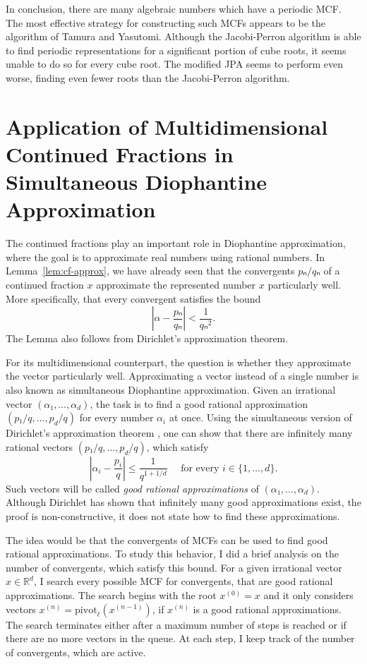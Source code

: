In conclusion, there are many algebraic numbers which have a periodic MCF.
The most effective strategy for constructing such MCFs appears to be the algorithm of
Tamura and Yasutomi.
Although the Jacobi-Perron algorithm is able to find periodic representations
for a significant portion of cube roots, it seems unable to do so for every
cube root.
The modified JPA seems to perform even worse, finding even fewer roots than the
Jacobi-Perron algorithm.

\section{Application of Multidimensional Continued Fractions in Simultaneous Diophantine Approximation}

The continued fractions play an important role in Diophantine approximation,
where the goal is to approximate real numbers using rational numbers.
In Lemma~\vref{lem:cf-approx}, we have already seen that the convergents
$pₙ/qₙ$ of a continued fraction $x$ approximate the represented number $x$
particularly well.
More specifically, that every convergent satisfies the bound
\[
  \left|α - \frac{pₙ}{qₙ}\right| < \frac{1}{qₙ^2}.
\]
The Lemma also follows from Dirichlet's approximation theorem.

For its multidimensional counterpart,
the question is whether they approximate the vector particularly well.
Approximating a vector instead of a single number is also known as simultaneous
Diophantine approximation.
Given an irrational vector $(α₁, …, α_d)$, the task is to find a good
rational approximation $(p₁/q, …, p_d/q)$ for every number $α_i$ at once.
Using the simultaneous version of Dirichlet's approximation theorem \cite{Schmidt80},
one can show that there are infinitely many rational vectors $(p₁/q, …, p_d/q)$,
which satisfy
\begin{equation}
  \label{eq:sim-approx}
  \left|α_i - \frac{p_i}{q}\right| ≤ \frac{1}{q^{1 + 1/d}}
  \quad
  \text{ for every } i ∈ \{1, …, d\}.
\end{equation}
Such vectors will be called \emph{good rational approximations} of $(α₁, …, α_d)$.
Although Dirichlet has shown that infinitely many good approximations exist,
the proof is non-constructive, it does not state how to find these approximations.

The idea would be that the convergents of MCFs can be used to find good
rational approximations.
To study this behavior, I did a brief analysis on the number of convergents,
which satisfy this bound.
For a given irrational vector $x ∈ ℝ^d$,
I search every possible MCF for convergents, that are good rational approximations.
The search begins with the root $x^{(0)} = x$ and
it only considers vectors $x^{(n)} = \mathrm{pivot}_ℓ(x^{(n-1)})$,
if $x^{(n)}$ is a good rational approximations.
The search terminates either after a maximum number of steps is reached or if
there are no more vectors in the queue.
At each step, I keep track of the number of convergents,
which are active.

